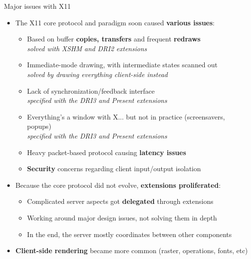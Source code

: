 \begin{frame}{Major issues with X11}
  \begin{itemize}
  \item The X11 core protocol and paradigm soon caused \textbf{various issues}:
    \begin{itemize}
    \item Based on buffer \textbf{copies, transfers} and frequent \textbf{redraws}\\
      \textit{solved with XSHM and DRI2 extensions}
    \item Immediate-mode drawing, with intermediate states scanned out\\
      \textit{solved by drawing everything client-side instead}
    \item Lack of synchronization/feedback interface\\
      \textit{specified with the DRI3 and Present extensions}
    \item Everything's a window with X... but not in practice (screensavers, popups)\\
    \textit{specified with the DRI3 and Present extensions}
    \item Heavy packet-based protocol causing \textbf{latency issues}
    \item \textbf{Security} concerns regarding client input/output isolation
    \end{itemize}
  \item Because the core protocol did not evolve, \textbf{extensions proliferated}:
    \begin{itemize}
    \item Complicated server aspects got \textbf{delegated} through extensions
    \item Working around major design issues, not solving them in depth
    \item In the end, the server mostly coordinates between other components
    \end{itemize}
  \item \textbf{Client-side rendering} became more common (raster, operations, fonts, etc)
  \end{itemize}
\end{frame}

